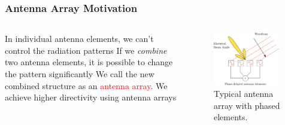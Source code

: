 \documentclass[10pt]{beamer}
\begin{document}
\begin{frame}
    \frametitle{Antenna Array Motivation}

    \begin{columns}[T]
        \begin{column}{.4\textwidth}
            \begin{outline}
                \1 In individual antenna elements, we can't control the radiation patterns
                \1 If we \textit{combine} two antenna elements, it is possible to change the pattern significantly
                \2 We call the new combined structure as an \textcolor{red}{antenna array}.
                \1 We achieve higher directivity using antenna arrays
            \end{outline}
        \end{column}
        \begin{column}{.6\textwidth}
            \begin{figure}[h!]
                \centering
                \includegraphics[width=0.95\textwidth]{antenna_array.pdf}
                \caption{Typical antenna array with phased elements.}
            \end{figure}
        \end{column}
    \end{columns}
        
\end{frame}
\end{document}
